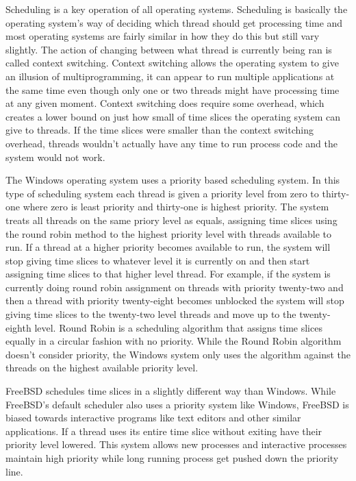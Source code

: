 \documentclass[10pt,serif,draftclsnofoot,onecolumn]{IEEEtran}
\begin{document}
	\par
			Scheduling is a key operation of all operating systems. Scheduling is basically the operating system's way of deciding which thread should get processing time and most operating systems are fairly similar in how they do this but still vary slightly. The action of changing between what thread is currently being ran is called context switching. Context switching allows the operating system to give an illusion of multiprogramming, it can appear to run multiple applications at the same time even though only one or two threads might have processing time at any given moment\cite{1}. Context switching does require some overhead, which creates a lower bound on just how small of time slices the operating system can give to threads. If the time slices were smaller than the context switching overhead, threads wouldn't actually have any time to run process code and the system would not work.
	\newline
	\newline
	\par
			The Windows operating system uses a priority based scheduling system. In this type of scheduling system each thread is given a priority level from zero to thirty-one where zero is least priority and thirty-one is highest priority. The system treats all threads on the same priory level as equals, assigning time slices using the round robin method to the highest priority level with threads available to run\cite{5}. If a thread at a higher priority becomes available to run, the system will stop giving time slices to whatever level it is currently on and then start assigning time slices to that higher level thread. For example, if the system is currently doing round robin assignment on threads with priority twenty-two and then a thread with priority twenty-eight becomes unblocked the system will stop giving time slices to the twenty-two level threads and move up to the twenty-eighth level. Round Robin is a scheduling algorithm that assigns time slices equally in a circular fashion with no priority. While the Round Robin algorithm doesn't consider priority, the Windows system only uses the algorithm against the threads on the highest available priority level.
	\newpage
	\par
			FreeBSD schedules time slices in a slightly different way than Windows. While FreeBSD's default scheduler also uses a priority system like Windows, FreeBSD is biased towards interactive programs like text editors and other similar applications\cite{1}. If a thread uses its entire time slice without exiting have their priority level lowered. This system allows new processes and interactive processes maintain high priority while long running process get pushed down the priority line.
\end{document}
